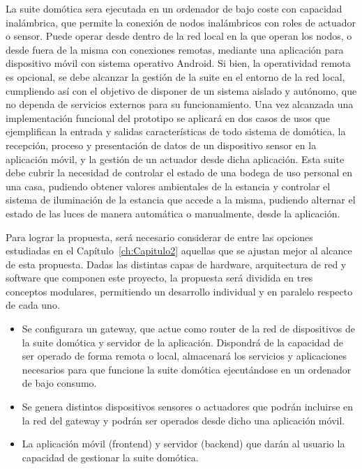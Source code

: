 \vspace{1cm}

La suite domótica sera ejecutada en un ordenador de bajo coste con capacidad inalámbrica, que permite la conexión de nodos inalámbricos con roles de actuador o sensor. Puede operar desde dentro de la red local en la que operan los nodos, o desde fuera de la misma con conexiones remotas, mediante una aplicación para dispositivo móvil con sistema operativo Android. Si bien, la operatividad remota es opcional, se debe alcanzar la gestión de la suite en el entorno de la red local, cumpliendo así con el objetivo de disponer de un sistema aislado y autónomo, que no dependa de servicios externos para su funcionamiento. Una vez alcanzada una implementación funcional del prototipo se aplicará en dos casos de usos que ejemplifican la entrada y salidas características de todo sistema de domótica, la recepción, proceso y presentación de datos de un dispositivo sensor en la aplicación móvil, y la gestión de un actuador desde dicha aplicación. Esta suite debe cubrir la necesidad de controlar el estado de una bodega de uso personal en una casa, pudiendo obtener valores ambientales de la estancia y controlar el sistema de iluminación de la estancia que accede a la misma, pudiendo alternar el estado de las luces de manera automática o manualmente, desde la aplicación.

\vspace{1cm}

Para lograr la propuesta, será necesario considerar de entre las opciones estudiadas en el Capítulo~\ref{ch:Capitulo2} aquellas que se ajustan mejor al alcance de esta propuesta. Dadas las distintas capas de hardware, arquitectura de red y software que componen este proyecto, la propuesta será dividida en tres conceptos modulares, permitiendo un desarrollo individual y en paralelo respecto de cada uno.

\begin{itemize}

\item Se configurara un gateway, que actue como router de la red de dispositivos de la suite domótica y servidor de la aplicación. Dispondrá de la capacidad de ser operado de forma remota o local, almacenará los servicios y aplicaciones necesarios para que funcione la suite domótica ejecutándose en un ordenador de bajo consumo.

\item Se genera distintos dispositivos sensores o actuadores que podrán incluirse en la red del \gls{gateway} y podrán ser operados desde dicho una aplicación móvil.

\item La aplicación móvil (frontend) y servidor (backend) que darán al usuario la capacidad de gestionar la suite domótica.

\end{itemize}

